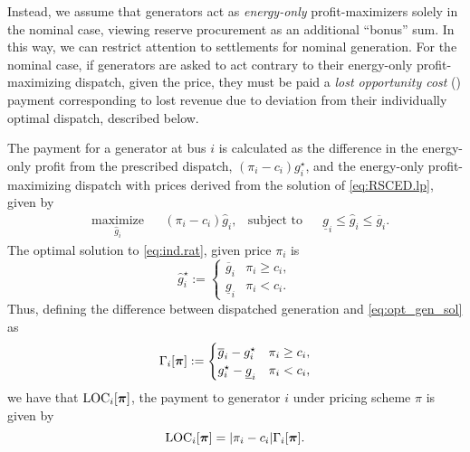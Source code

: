 Instead, we assume that generators act as \emph{energy-only} profit-maximizers solely in the nominal case, viewing reserve procurement as an additional ``bonus'' sum. In this way, we can restrict attention to settlements for nominal generation. 
For the nominal case, if generators are asked to act contrary to their energy-only profit-maximizing dispatch, given the price, they must be paid a \emph{lost opportunity cost} (\LOC{}) payment corresponding to lost revenue due to deviation from their individually optimal dispatch, described below.

The \LOC{} payment for a generator at bus $i$ is calculated as the difference in the energy-only profit from the prescribed dispatch, $(\pi_i - c_i) g_i^\star$, and the energy-only profit-maximizing dispatch with prices derived from the solution of \eqref{eq:RSCED.lp}, given by
\begin{equation}
  \label{eq:ind.rat}
\begin{aligned}
    & \underset{\hat{g}_i}{\text{maximize}} && (\pi_i - c_i) \hat{g}_i, & \text{subject to} && \underline{g}_i \le \hat{g}_i \le \overline{g}_i.
\end{aligned}
\end{equation}
The optimal solution to \eqref{eq:ind.rat}, given price $\pi_i$ is 
  \begin{equation}\label{eq:opt_gen_sol}
      \hat{g}_i^\star := \begin{cases}
        \overline{g}_i & \pi_i \geq c_i, \\
        \underline{g}_i & \pi_i < c_i. 
      \end{cases}
  \end{equation}
Thus, defining the difference between dispatched generation and \eqref{eq:opt_gen_sol} as
\begin{equation}
      \Gamma_i[{\bm{\pi}}] := \begin{cases}
        \overline{g}_i - g_i^\star & \pi_i \ge c_i, \\
        g_i^\star - \underline{g}_i & \pi_i < c_i, 
      \end{cases}
  \end{equation}
we have that ${\rm LOC}{}_i[{\bm{\pi}}]$, the \LOC{} payment to generator $i$ under pricing scheme $\pi$ is given by 
\begin{equation}\label{eq:LOC_i}
      {\rm LOC}{}_i[{\bm{\pi}}] = | \pi_i - c_i | \Gamma_i[{\bm{\pi}}]. 
  \end{equation}

